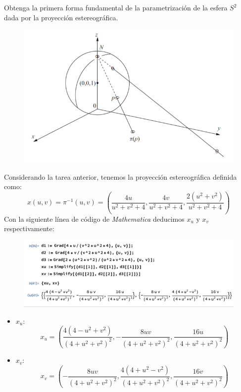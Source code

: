 \begin{problema}
    Obtenga la primera forma fundamental de la parametrización de la esfera $S^{2}$ dada por la proyección estereográfica.
    \begin{figure}[H]
        \centering
        \includegraphics[scale=0.5]{imagenes/1.png}
    \end{figure}
    \begin{dem}
        Considerando la tarea anterior, tenemos la proyección estereográfica definida como: 
        $$x(u,v)=\pi^{-1}(u,v) = \left(\frac{4u}{u^2+v^2+4}, \frac{4v}{u^2+v^2+4},\frac{2(u^2+v^2)}{u^2+v^2+4}\right)$$
        Con la siguiente línea de código de \textit{Mathematica} deducimos $x_u$ y $x_v$ respectivamente: 
        \begin{figure}[H]
            \centering
            \includegraphics[scale=0.6]{imagenes/2.png}
        \end{figure}
        \begin{itemize}
            \item $x_u$: 
            $$x_u=\left(\frac{4(4-u^2+v^2)}{(4+u^2+v^2)^2}, -\frac{8uv}{(4+u^2+v^2)^2},\frac{16u}{(4+u^2+v^2)^2}\right)$$
            \item $x_v$: 
            $$x_v=\left(-\frac{8uv}{(4+u^2+v^2)^2},\frac{4(4+u^2-v^2)}{(4+u^2+v^2)^2},\frac{16v}{(4+u^2+v^2)^2}\right)$$
        \end{itemize}


\end{dem}
\end{problema}
